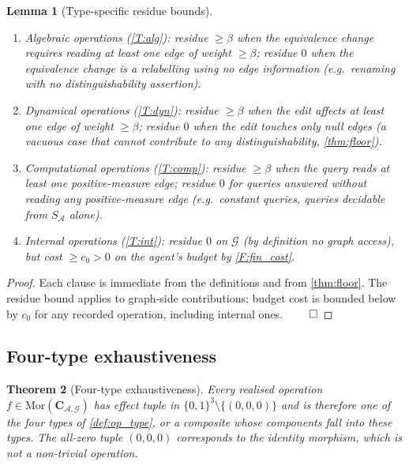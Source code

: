 \documentclass[11pt,a4paper]{article}
\theoremstyle{thmstyle}
\newtheorem{theorem}{Theorem}[section]
\newtheorem{lemma}[theorem]{Lemma}
\theoremstyle{definition}
\theoremstyle{remark}
\newcommand{\Graph}{\mathcal{G}}
\newcommand{\Agent}{\mathcal{A}}
\newcommand{\floor}{\beta}
\begin{document}
\begin{lemma}[Type-specific residue bounds]
\label{lem:type_residues}
\begin{enumerate}[nosep,leftmargin=*]
\item Algebraic operations (\ref{T:alg}): residue $\geq \floor$
when the equivalence change requires reading at least one edge of
weight $\geq \floor$; residue $0$ when the equivalence change is a
relabelling using no edge information (e.g.~renaming with no
distinguishability assertion).
\item Dynamical operations (\ref{T:dyn}): residue $\geq \floor$
when the edit affects at least one edge of weight $\geq \floor$;
residue $0$ when the edit touches only null edges (a vacuous case
that cannot contribute to any distinguishability,
\cref{thm:floor}).
\item Computational operations (\ref{T:comp}): residue $\geq \floor$
when the query reads at least one positive-measure edge; residue
$0$ for queries answered without reading any positive-measure edge
(e.g.~constant queries, queries decidable from $S_\Agent$ alone).
\item Internal operations (\ref{T:int}): residue $0$ on $\Graph$
(by definition no graph access), but cost $\geq c_0 > 0$ on the
agent's budget by \cref{F:fin_cost}.
\end{enumerate}
\end{lemma}

\begin{proof}
Each clause is immediate from the definitions and from
\cref{thm:floor}. The residue bound applies to graph-side
contributions; budget cost is bounded below by $c_0$ for any
recorded operation, including internal ones. $\qed$
\end{proof}

\subsection{Four-type exhaustiveness}

\begin{theorem}[Four-type exhaustiveness]
\label{thm:three_types}
Every realised operation $f \in \mathrm{Mor}(\mathbf{C}_{\Agent,
\Graph})$ has effect tuple in
$\{0,1\}^3 \setminus \{(0,0,0)\}$ and is therefore one of the four
types of \cref{def:op_type}, or a composite whose components fall
into these types. The all-zero tuple $(0,0,0)$ corresponds to the
identity morphism, which is not a non-trivial operation.
\end{theorem}
\end{document}
